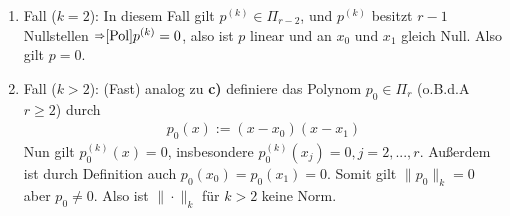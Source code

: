 \begin{solution}
\begin{enumerate}[label = \textbf{\alph*)}]
\begin{enumerate}[label = \textit{\roman*)}]
\begin{enumerate}[label = \textit{\arabic*.}]
      \item Fall ($k=2$):
      In diesem Fall gilt $p^{(k)} \in \Pi_{r-2}$, und $p^{(k)}$ besitzt $r-1$ Nullstellen $\substack{\Rightarrow}{\eqref{Pol}} p^{(k)} = 0$, also ist $p$ linear und an $x_0$ und $x_1$ gleich Null. Also gilt $p=0$.

      \item Fall ($k>2$):
      (Fast) analog zu \textbf{c)} definiere das Polynom $p_0 \in \Pi_r$ (o.B.d.A $r \geq 2$) durch
      \begin{align*}
        p_0(x) := (x-x_0)(x-x_1)
      \end{align*}
      Nun gilt $p_0^{(k)}(x) = 0$, insbesondere $p_0^{(k)}(x_j) = 0, j=2,...,r$. Außerdem ist durch Definition auch $p_0(x_0) = p_0(x_1) = 0$.
      Somit gilt $\|p_0\|_k = 0$ aber $p_0 \neq 0$. Also ist $\|\cdot\|_k$ für $k>2$ keine Norm.
    \end{enumerate}
  \end{enumerate}
\end{enumerate}
\end{solution}
